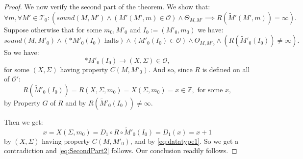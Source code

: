 \documentclass{amsart}  %
\numberwithin{equation}{section}
\theoremstyle{definition}
\theoremstyle{remark}
\begin{document}
{\begin{proof}
We now verify the second part of the theorem. 
We show that: 
   \begin{equation} \label{eq:SecondPart2}
      \forall m, \forall M' \in \mathcal{T} _{0}:    \left(sound (M,M') \land (M'(M',m) \in \mathcal{O}) \land \Theta _{M,M' }    \implies R (\widetilde{M}'(M',m)) = \infty \right).
\end{equation}
Suppose otherwise that for some $m _{0},M' _{0}  $ and $I _{0}:= (M' _{0} , m _{0}) $ we have: 
   \begin{equation*}    sound (M,M' _{0} ) \land (* M' _{0} (I _{0}) \text{ halts}) \land (M' _{0} (I _{0} ) \in \mathcal{O}) \land \Theta _{M,M' _{0}  } \land (R (\widetilde{M}' _{0}   (I _{0} )) \neq \infty).
   \end{equation*}
So we have:
\begin{equation} \label{eq:datatype1}
   *M'_{0} (I _{0} ) \to (X, \Sigma ) \in \mathcal{O},
\end{equation}
   for some $(X, \Sigma )$ having property $C (M,M' _{0} )$.
And so, since $R$ is defined on all of $\mathcal{O}'$: $$R (\widetilde{M}' _{0}  (I _{0} )) = R (X, \Sigma, m _{0}) =  X (\Sigma,m _{0}  ) =x \in \mathbb{Z}, \text{ for some $x$}, 
$$ 
   by Property $G$ of $R$ and by $R (\widetilde{M}' _{0}  (I _{0} )) \neq \infty$.

   Then we get: $$x = X (\Sigma,m _{0}) =  D_1 \circ R \circ \widetilde{M} ' _{0}  (I _{0} ) = D _{1} (x) =  x+1 $$  by $(X, \Sigma)$ having property $C (M,M' _{0} )$, and by \eqref{eq:datatype1}. So we get a contradiction and \eqref{eq:SecondPart2} follows.
Our conclusion readily follows.
\end{proof}

}
\end{document}
